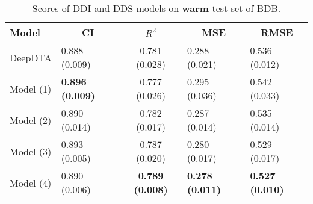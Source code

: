\begin{table}[H]
\centering
\caption{Scores of DDI and DDS models on \textbf{warm} test set of BDB.}
\label{tab:ddi_ci_r2}
\begin{tabular}{|l|l|c|l|l|} 
\hline
Model & \multicolumn{1}{c|}{CI} & $R^2$ & \multicolumn{1}{c|}{MSE} & \multicolumn{1}{c|}{RMSE} \\ 
\hline
DeepDTA & 0.888 (0.009) & 0.781 (0.028) & 0.288 (0.021) & 0.536 (0.012) \\ 
\hline
Model (1) & \textbf{0.896 (0.009)} & 0.777 (0.026) & 0.295 (0.036) & 0.542 (0.033) \\ 
\hline
Model (2) & 0.890 (0.014) & 0.782 (0.017) & 0.287 (0.014) & 0.535 (0.014) \\ 
\hline
Model (3) & 0.893 (0.005) & 0.787 (0.020) & 0.280 (0.017) & 0.529 (0.017) \\ 
\hline
Model (4) & 0.890 (0.006) & \textbf{0.789 (0.008)} & \textbf{0.278 (0.011)} & \textbf{0.527 (0.010)} \\
\hline
\end{tabular}
\label{tab:ddi_vs_dds_warm}
\end{table}